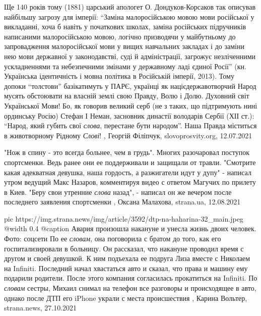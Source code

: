 Ще 140 років тому (1881) царський апологет О. Дондуков-Корсаков так описував
найбільшу загрозу для імперії: \enquote{Заміна малоросійською мовою мови російської у
викладанні, хоча б навіть у початкових школах, заміна російських підручників
написаними малоросійською мовою, логічно призводячи у майбутньому до
запровадження малоросійської мови у вищих навчальних закладах і до заміни нею
мови державної у законодавстві, суді й адміністрації, загрожує незліченними
ускладненнями та небезпечними змінами у державному ладі єдиної Росії} (кн.
Українська ідентичність і мовна політика в Російській імперії, 2013).  Тому
допоки \enquote{толстови} базікатимуть у ПАРЄ, українці як націєдержавотворчий Народ
мусять обстоювати на власній землі свою Правду, Волю і Долю. Духовний світ
Української Мови! Бо, як говорив великий серб (не з таких, що підтримують нині
ординську Росію) Стефан І Неман, засновник династії володарів Сербії (ХІІ ст.):
\enquote{Народ, який губить свої \emph{слова}, перестане бути народом}. Наша Правда міститься
в животворному Рідному \emph{Слові}!
, Георгій Філіпчук, slovoprosvity.org, 12.07.2021

"Нож в спину - это всегда больнее, чем в грудь".  Многих разочаровал поступок
спортсменки. Ведь ранее они ее поддерживали и защищали от травли.  "Смотрите
какая адекватная девушка, наша гордость, а разжигатели идут у дупу" - написал
утром ведущий Макс Назаров, комментируя видео с ответом Магучих по прилету в
Киев. "Беру свои утренние \emph{слова} назад", - написал он же вечером после
последнего заявления спортсменки
, 
Оксана Малахова, strana.ua, 12.08.2021

\ifcmt
  pic https://img.strana.news/img/article/3592/dtp-na-haharina-32_main.jpeg
  @width 0.4
	@caption Авария произошла накануне и унесла жизнь двоих человек. Фото: соцсети 
\fi
По ее \emph{словам}, она поговорила с братом до того, как его госпитализировали
в больницу. Он рассказал, что накануне проводил время с другом и своей
девушкой.  К ним подъехала ее подруга Лиза вместе с Николаем на Infiniti.
Последний начал хвастаться авто и сказал, что права и машину ему подарили
родители. После этого компания согласилась прокатиться на Infiniti.  По
\emph{словам} сестры, Михаил снимал на телефон все разговоры и происходящее в
авто, однако после ДТП его iPhone украли с места происшествия
, 
Карина Вольтер, strana.news, 27.10.2021

